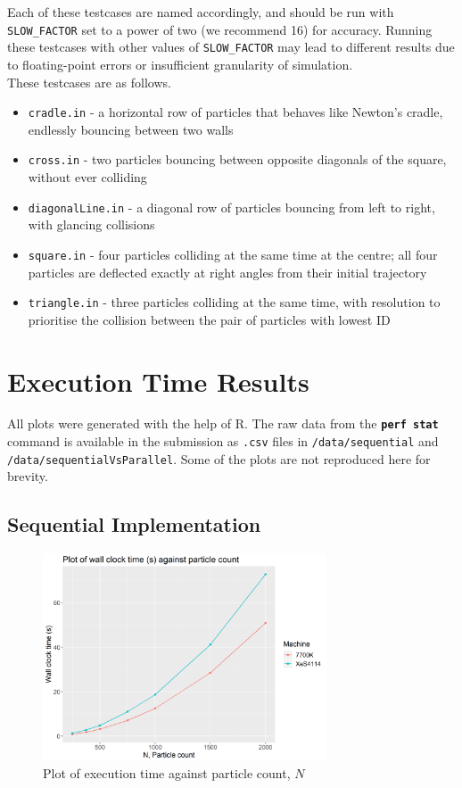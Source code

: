 \documentclass[12pt]{article}
\newcommand{\bt}[1]{\texttt{\textbf{#1}}}
\begin{document}
Each of these testcases are named accordingly, and should be run with \texttt{SLOW\_FACTOR} set to a power of two (we recommend 16) for accuracy. Running these testcases with other values of \texttt{SLOW\_FACTOR} may lead to different results due to floating-point errors or insufficient granularity of simulation. \\

These testcases are as follows.

\begin{itemize}
	\item \texttt{cradle.in} - a horizontal row of particles that behaves like Newton’s cradle, endlessly bouncing between two walls
	\item \texttt{cross.in} - two particles bouncing between opposite diagonals of the square, without ever colliding
	\item \texttt{diagonalLine.in} - a diagonal row of particles bouncing from left to right, with glancing collisions
	\item \texttt{square.in} - four particles colliding at the same time at the centre; all four particles are deflected exactly at right angles from their initial trajectory
	\item \texttt{triangle.in} - three particles colliding at the same time, with resolution to prioritise the collision between the pair of particles with lowest ID
\end{itemize}

\pagebreak

\section{Execution Time Results}

All plots were generated with the help of R. The raw data from the \bt{perf stat} command is available in the submission as \texttt{.csv} files in \texttt{/data/sequential} and \texttt{/data/sequentialVsParallel}. Some of the plots are not reproduced here for brevity.

\subsection{Sequential Implementation}

\begin{figure}[H]
    \centering
    \includegraphics[width=0.75\textwidth]{./processedResults/seq-varyN}
    \caption{Plot of execution time against particle count, $N$}
    \label{fig:seq-varyN}
\end{figure}
\end{document}
